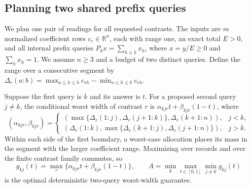 \subsection{Planning two shared prefix queries}
\label{sec:shared-planner-algorithm}
We plan one pair of readings for all requested contrasts.  The inputs are
$m$ normalized coefficient rows $c_r\in\mathbb R^n$, each with range one,
an exact total $E>0$, and all internal prefix queries
$P_kx=\sum_{h\leq k}x_h$, where $x=y/E\geq0$ and $\sum_hx_h=1$.
We assume $n\geq3$ and a budget of two distinct queries.  Define the range
over a consecutive segment by
$\Delta_r(a{:}b)=\max_{a\leq h\leq b}c_{rh}-\min_{a\leq h\leq b}c_{rh}$.

Suppose the first query is $k$ and its answer is $t$.  For a proposed
second query $j\ne k$, the conditional worst width of contrast $r$ is
$\alpha_{kjr}t+\beta_{kjr}(1-t)$, where
\[
 (\alpha_{kjr},\beta_{kjr})=
 \begin{cases}
 (\max\{\Delta_r(1{:}j),\Delta_r(j+1{:}k)\},
             \Delta_r(k+1{:}n)),&j<k,\\
 (\Delta_r(1{:}k),
       \max\{\Delta_r(k+1{:}j),\Delta_r(j+1{:}n)\}),&j>k.
 \end{cases}
\]
Within each side of the first boundary, a worst-case allocation places
its mass in the segment with the larger coefficient range.  Maximizing
over records and over the finite contrast family commutes, so
\[
 g_{kj}(t)=\max_r\{\alpha_{kjr}t+\beta_{kjr}(1-t)\},\qquad
 A=\min_k\max_{t\in[0,1]}\min_{j\ne k}g_{kj}(t)
\]
is the optimal deterministic two-query worst-width guarantee.

\begin{center}
\end{center}

